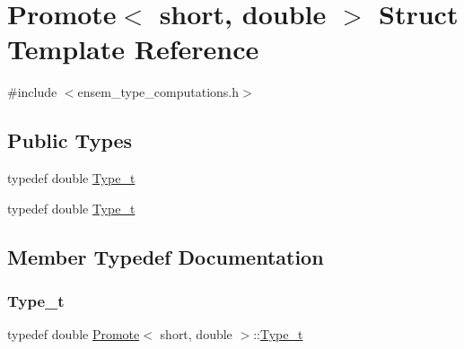 \hypertarget{structPromote_3_01short_00_01double_01_4}{}\section{Promote$<$ short, double $>$ Struct Template Reference}
\label{structPromote_3_01short_00_01double_01_4}


{\ttfamily \#include $<$ensem\+\_\+type\+\_\+computations.\+h$>$}

\subsection*{Public Types}
\begin{DoxyCompactItemize}
\item 
typedef double \mbox{\hyperlink{structPromote_3_01short_00_01double_01_4_ac1a01602078262e2918f806dee9199c4}{Type\+\_\+t}}
\item 
typedef double \mbox{\hyperlink{structPromote_3_01short_00_01double_01_4_ac1a01602078262e2918f806dee9199c4}{Type\+\_\+t}}
\end{DoxyCompactItemize}


\subsection{Member Typedef Documentation}
\mbox{\label{structPromote_3_01short_00_01double_01_4_ac1a01602078262e2918f806dee9199c4}} 
\subsubsection{\texorpdfstring{Type\_t}{Type\_t}\hspace{0.1cm}{\footnotesize\ttfamily [1/2]}}
{\footnotesize\ttfamily typedef double \mbox{\hyperlink{structPromote}{Promote}}$<$ short, double $>$\+::\mbox{\hyperlink{structPromote_3_01short_00_01double_01_4_ac1a01602078262e2918f806dee9199c4}{Type\+\_\+t}}}

\mbox{\label{structPromote_3_01short_00_01double_01_4_ac1a01602078262e2918f806dee9199c4}} 
